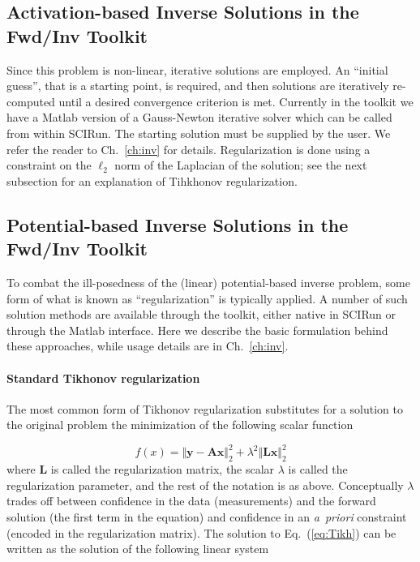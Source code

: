 \subsection{Activation-based Inverse Solutions in the Fwd/Inv Toolkit}

Since this problem is non-linear, iterative solutions are employed. An
``initial guess'', that is a starting point, is required, and then
solutions are iteratively re-computed until a desired convergence criterion
is met. Currently in the toolkit we have a Matlab version of a Gauss-Newton
iterative solver which can be called from within SCIRun. The starting
solution must be supplied by the user. We refer the reader to
Ch.~\ref{ch:inv} for details. Regularization is done using a constraint on
the $\ell_{2}$ norm of the Laplacian of the solution; see the next subsection
for an explanation of Tihkhonov regularization.

\subsection{Potential-based Inverse Solutions in the Fwd/Inv Toolkit}

To combat the ill-posedness of the (linear) potential-based inverse
problem, some form of what is known as ``regularization'' is typically
applied. A number of such solution methods are available through the
toolkit, either native in SCIRun or through the Matlab interface. Here we
describe the basic formulation behind these approaches, while usage details
are in Ch.~\ref{ch:inv}. 

\paragraph{Standard Tikhonov regularization}

The most common form of Tikhonov regularization substitutes for a solution to the original problem
the minimization of the following scalar function 

\begin{equation}
  f(x)=\Vert{\mathbf{y}-\mathbf{A}\mathbf{x}}\Vert_2^2+\lambda^2\Vert{\mathbf{L}\mathbf{x}}\Vert_2^2
\label{eq:Tikh}
\end{equation} 
where $\mathbf{L}$ is called the regularization matrix, the scalar
$\lambda$ is called the regularization parameter, and the rest of the
notation is as above. Conceptually $\lambda$ trades off between confidence
in the data (measurements) and the forward solution (the first term in the
equation) and confidence in an \textit{a~priori} constraint (encoded in the
regularization matrix). The solution to Eq.~(\ref{eq:Tikh}) can be written
as the solution of the following linear system

